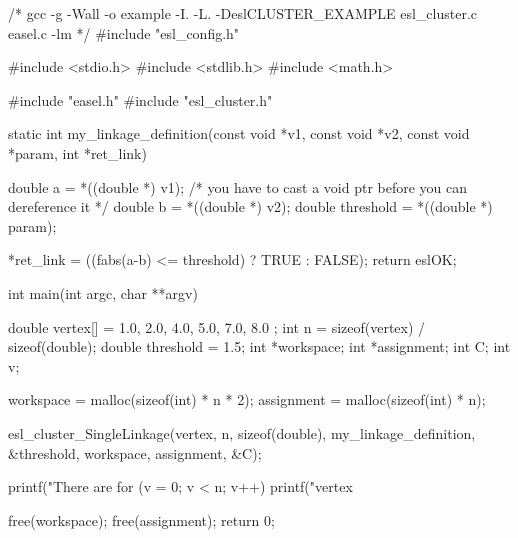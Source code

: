 \begin{cchunk}
/* gcc -g -Wall -o example -I. -L. -DeslCLUSTER_EXAMPLE esl_cluster.c easel.c -lm  */
#include "esl_config.h"

#include <stdio.h>
#include <stdlib.h>
#include <math.h>

#include "easel.h"
#include "esl_cluster.h"

static int
my_linkage_definition(const void *v1, const void *v2, const void *param, int *ret_link)
{
  double a         = *((double *) v1); /* you have to cast a void ptr before you can dereference it */
  double b         = *((double *) v2);
  double threshold = *((double *) param);

  *ret_link =  ((fabs(a-b) <= threshold) ? TRUE : FALSE);
  return eslOK;
}

int
main(int argc, char **argv)
{
  double vertex[]  = { 1.0, 2.0, 4.0, 5.0, 7.0, 8.0 };
  int    n         = sizeof(vertex) / sizeof(double);
  double threshold = 1.5;
  int   *workspace;
  int   *assignment;
  int    C;
  int    v;

  workspace  = malloc(sizeof(int) * n * 2);
  assignment = malloc(sizeof(int) * n);

  esl_cluster_SingleLinkage(vertex, n, sizeof(double),
			    my_linkage_definition, &threshold,
			    workspace, assignment, &C);

  printf("There are %
  for (v = 0; v < n; v++) printf("vertex %
  
  free(workspace);
  free(assignment);
  return 0;
}
\end{cchunk}
